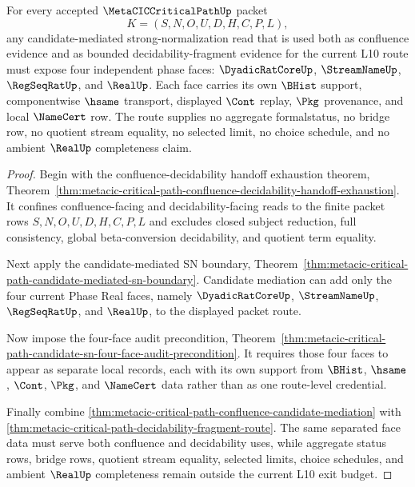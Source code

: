 \begin{theorem}
\label{thm:metacic-critical-path-confluence-decidability-exit-budget}
For every accepted $\MetaCICCriticalPathUp$ packet
$$
K=(S,N,O,U,D,H,C,P,L),
$$
any candidate-mediated strong-normalization read that is used both as confluence evidence and as bounded decidability-fragment evidence for the current L10 route must expose four independent phase faces: $\DyadicRatCoreUp$, $\StreamNameUp$, $\RegSeqRatUp$, and $\RealUp$. Each face carries its own $\BHist$ support, componentwise $\hsame$ transport, displayed $\Cont$ replay, $\Pkg$ provenance, and local $\NameCert$ row. The route supplies no aggregate formalstatus, no bridge row, no quotient stream equality, no selected limit, no choice schedule, and no ambient $\RealUp$ completeness claim.
\end{theorem}
\begin{proof}
Begin with the confluence-decidability handoff exhaustion theorem, Theorem~\ref{thm:metacic-critical-path-confluence-decidability-handoff-exhaustion}. It confines confluence-facing and decidability-facing reads to the finite packet rows $S,N,O,U,D,H,C,P,L$ and excludes closed subject reduction, full consistency, global beta-conversion decidability, and quotient term equality.

Next apply the candidate-mediated SN boundary, Theorem~\ref{thm:metacic-critical-path-candidate-mediated-sn-boundary}. Candidate mediation can add only the four current Phase Real faces, namely $\DyadicRatCoreUp$, $\StreamNameUp$, $\RegSeqRatUp$, and $\RealUp$, to the displayed packet route.

Now impose the four-face audit precondition, Theorem~\ref{thm:metacic-critical-path-candidate-sn-four-face-audit-precondition}. It requires those four faces to appear as separate local records, each with its own support from $\BHist$, $\hsame$, $\Cont$, $\Pkg$, and $\NameCert$ data rather than as one route-level credential.

Finally combine \autoref{thm:metacic-critical-path-confluence-candidate-mediation} with \autoref{thm:metacic-critical-path-decidability-fragment-route}. The same separated face data must serve both confluence and decidability uses, while aggregate status rows, bridge rows, quotient stream equality, selected limits, choice schedules, and ambient $\RealUp$ completeness remain outside the current L10 exit budget.
\end{proof}

